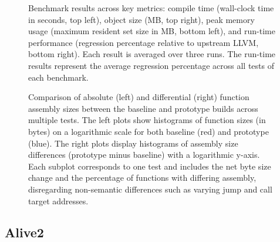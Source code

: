 \documentclass[a4paper,12pt]{article}
\begin{document}
\begin{figure}[H]
  \begin{minipage}[b]{0.48\textwidth}
    
  \end{minipage}
  \begin{minipage}[b]{0.48\textwidth}
    
  \end{minipage}

  \begin{minipage}[b]{0.48\textwidth}
    
  \end{minipage}
  \begin{minipage}[b]{0.48\textwidth}
    
  \end{minipage}
  \caption{Benchmark results across key metrics: compile time (wall-clock time in seconds, top left), object size (MB, top right), peak memory usage (maximum resident set size in MB, bottom left), and run-time performance (regression percentage relative to upstream LLVM, bottom right). Each result is averaged over three runs. The run-time results represent the average regression percentage across all tests of each benchmark.}
  \label{fig:bench}
\end{figure}

\begin{figure}[H]
  \begin{minipage}[b]{0.48\textwidth}
    
  \end{minipage}
  \begin{minipage}[b]{0.48\textwidth}
    
  \end{minipage}
  \caption{Comparison of absolute (left) and differential (right) function assembly sizes between the baseline and prototype builds across multiple tests. The left plots show histograms of function sizes (in bytes) on a logarithmic scale for both baseline (red) and prototype (blue). The right plots display histograms of assembly size differences (prototype minus baseline) with a logarithmic y-axis. Each subplot corresponds to one test and includes the net byte size change and the percentage of functions with differing assembly, disregarding non-semantic differences such as varying jump and call target addresses.}
  \label{fig:bench-asm}
\end{figure}

\subsection{Alive2}
\end{document}
